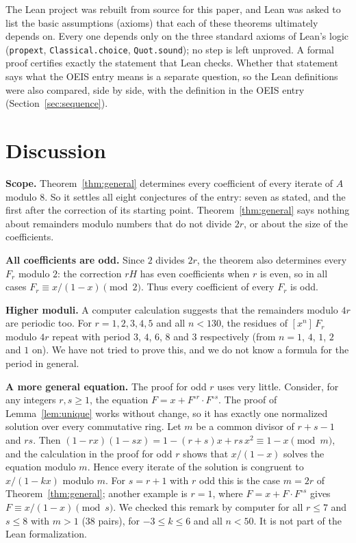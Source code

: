 \documentclass[11pt,a4paper]{article}
\theoremstyle{definition}
\theoremstyle{remark}
\newcommand{\coeff}[2]{[x^{#1}]\,#2}
\newcommand{\para}[1]{\par\medskip\noindent\textbf{#1}\enspace}
\begin{document}
The Lean project was rebuilt from source for this paper, and Lean was asked to list the basic assumptions (axioms)
that each of these theorems ultimately depends on. Every one depends only on the three standard axioms of Lean's logic
(\texttt{propext}, \texttt{Classical.choice}, \texttt{Quot.sound}); no step is left unproved. A formal proof certifies
exactly the statement that Lean checks. Whether that statement says what the OEIS entry means is a separate question,
so the Lean definitions were also compared, side by side, with the definition in the OEIS entry
(Section~\ref{sec:sequence}).

\section{Discussion}\label{sec:discussion}

\para{Scope.} Theorem~\ref{thm:general} determines every coefficient of every iterate of $A$ modulo $8$. So it
settles all eight conjectures of the entry: seven as stated, and the first after the correction of its starting
point. Theorem~\ref{thm:general} says nothing about remainders modulo numbers that do
not divide $2r$, or about the size of the coefficients.

\para{All coefficients are odd.} Since $2$ divides $2r$, the theorem also determines every $F_r$ modulo $2$: the
correction $rH$ has even coefficients when $r$ is even, so in all cases $F_r\equiv x/(1-x)\pmod2$. Thus every
coefficient of every $F_r$ is odd.

\para{Higher moduli.} A computer calculation suggests that the remainders modulo $4r$ are periodic too. For $r=1,2,3,4,5$
and all $n<130$, the residues of $\coeff{n}{F_r}$ modulo $4r$ repeat with period $3$, $4$, $6$, $8$ and $3$
respectively (from $n=1$, $4$, $1$, $2$ and $1$ on). We have not tried to prove this, and we do not know a formula for
the period in general.

\para{A more general equation.} The proof for odd $r$ uses very little. Consider, for any integers $r,s\ge1$, the
equation $F=x+F^{\circ r}\cdot F^{\circ s}$. The proof of Lemma~\ref{lem:unique} works without change, so it has exactly
one normalized solution over every commutative ring. Let $m$ be a common divisor of $r+s-1$ and $rs$. Then
$(1-rx)(1-sx)=1-(r+s)x+rs\,x^2\equiv1-x\pmod m$, and the calculation in the proof for odd $r$ shows that
$x/(1-x)$ solves the equation modulo $m$. Hence every iterate of the solution is congruent to $x/(1-kx)$ modulo $m$.
For $s=r+1$ with $r$ odd this is the case $m=2r$ of Theorem~\ref{thm:general}; another example is $r=1$, where
$F=x+F\cdot F^{\circ s}$ gives $F\equiv x/(1-x)\pmod s$. We checked this remark by computer for all $r\le7$ and
$s\le8$ with $m>1$ ($38$ pairs), for $-3\le k\le6$ and all $n<50$. It is not part of the Lean formalization.
\end{document}
